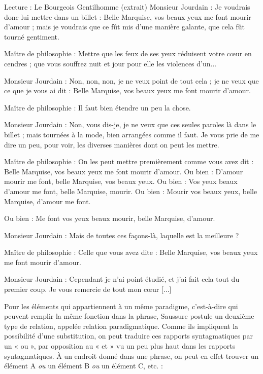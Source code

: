 \begin{lecture}{Lecture : Le Bourgeois Gentilhomme (extrait)}
Monsieur Jourdain : Je voudrais donc lui mettre dans un billet : Belle Marquise, vos beaux yeux me font mourir d’amour ; mais je voudrais que ce fût mis d’une manière galante, que cela fût tourné gentiment.

Maître de philosophie : Mettre que les feux de ses yeux réduisent votre cœur en cendres ; que vous souffrez nuit et jour pour elle les violences d’un...

Monsieur Jourdain : Non, non, non, je ne veux point de tout cela ; je ne veux que ce que je vous ai dit : Belle Marquise, vos beaux yeux me font mourir d’amour.

Maître de philosophie : Il faut bien étendre un peu la chose.

Monsieur Jourdain : Non, vous dis-je, je ne veux que ces seules paroles là dans le billet ; mais tournées à la mode, bien arrangées comme il faut. Je vous prie de me dire un peu, pour voir, les diverses manières dont on peut les mettre.

Maître de philosophie : On les peut mettre premièrement comme vous avez dit : Belle Marquise, vos beaux yeux me font mourir d’amour. Ou bien : D’amour mourir me font, belle Marquise, vos beaux yeux. Ou bien : Vos yeux beaux d’amour me font, belle Marquise, mourir. Ou bien : Mourir vos beaux yeux, belle Marquise, d’amour me font.

Ou bien : Me font vos yeux beaux mourir, belle Marquise, d’amour.

Monsieur Jourdain : Mais de toutes ces façons-là, laquelle est la meilleure ?

Maître de philosophie : Celle que vous avez dite : Belle Marquise, vos beaux yeux me font mourir d’amour.

Monsieur Jourdain : Cependant je n’ai point étudié, et j’ai fait cela tout du premier coup. Je vous remercie de tout mon cœur [...]
\end{lecture}

Pour les éléments qui appartiennent à un même paradigme, c’est-à-dire qui peuvent remplir la même fonction dans la phrase, Saussure postule un deuxième type de relation, appelée relation paradigmatique. Comme ils impliquent la possibilité d’une substitution, on peut traduire ces rapports syntagmatiques par un « ou », par opposition au « et » vu un peu plus haut dans les rapports syntagmatiques. À un endroit donné dans une phrase, on peut en effet trouver un élément A \textit{ou} un élément B \textit{ou} un élément C, etc. :

